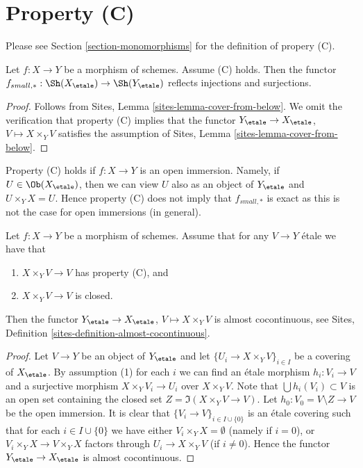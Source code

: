 \section{Property (C)}
\label{section-C}

\noindent
Please see Section \ref{section-monomorphisms} for the definition of propery
(C).

\begin{lemma}
\label{lemma-property-C-implies}
Let $f : X \to Y$ be a morphism of schemes. Assume (C) holds. Then the functor
$f_{small, *} :
\Sh(X_\etale)
\to
\Sh(Y_\etale)$
reflects injections and surjections.
\end{lemma}

\begin{proof}
Follows from
Sites, Lemma \ref{sites-lemma-cover-from-below}.
We omit the verification that property (C) implies that the functor
$Y_\etale \to X_\etale$, $V \mapsto X \times_Y V$
satisfies the assumption of
Sites, Lemma \ref{sites-lemma-cover-from-below}.
\end{proof}

\begin{remark}
\label{remark-property-C-strong}
Property (C) holds if $f : X \to Y$ is an open immersion. Namely, if
$U \in \Ob(X_\etale)$, then we can view $U$ also as an object
of $Y_\etale$ and $U \times_Y X = U$. Hence property (C)
does not imply that $f_{small, *}$ is exact as this is not
the case for open immersions (in general).
\end{remark}

\begin{lemma}
\label{lemma-property-C-closed-implies}
Let $f : X \to Y$ be a morphism of schemes. Assume that
for any $V \to Y$ \'etale we have that
\begin{enumerate}
\item $X \times_Y V \to V$ has property (C), and
\item $X \times_Y V \to V$ is closed.
\end{enumerate}
Then the functor
$Y_\etale \to X_\etale$, $V \mapsto X \times_Y V$
is almost cocontinuous, see
Sites, Definition \ref{sites-definition-almost-cocontinuous}.
\end{lemma}

\begin{proof}
Let $V \to Y$ be an object of $Y_\etale$ and let
$\{U_i \to X \times_Y V\}_{i \in I}$ be a covering of $X_\etale$.
By assumption (1) for each $i$ we can find an \'etale morphism
$h_i : V_i \to V$ and a surjective morphism $X \times_Y V_i \to U_i$
over $X \times_Y V$. Note that $\bigcup h_i(V_i) \subset V$ is an
open set containing the closed set $Z = \Im(X \times_Y V \to V)$.
Let $h_0 : V_0 = V \setminus Z \to V$ be the open immersion.
It is clear that $\{V_i \to V\}_{i \in I \cup \{0\}}$ is an
\'etale covering such that for each $i \in I \cup \{0\}$ we have
either $V_i \times_Y X = \emptyset$ (namely if $i = 0$), or
$V_i \times_Y X \to V \times_Y X$ factors through $U_i \to X \times_Y V$
(if $i \not = 0$). Hence the functor $Y_\etale \to X_\etale$
is almost cocontinuous.
\end{proof}


